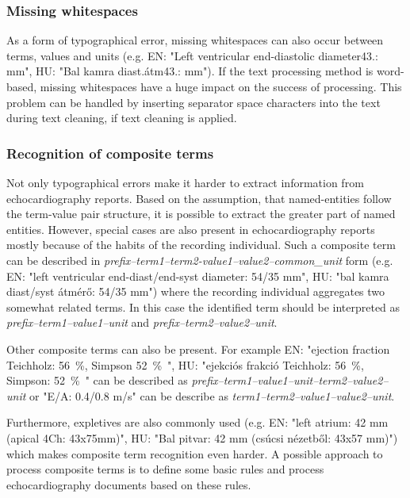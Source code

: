 \subsubsection*{Missing whitespaces}

As a form of typographical error, missing whitespaces can also occur between terms, values and units (e.g. EN: "Left ventricular end-diastolic diameter43.: mm", HU: "Bal kamra diast.átm43.: mm"). If the text processing method is word-based, missing whitespaces have a huge impact on the success of processing. This problem can be handled by inserting separator space characters into the text during text cleaning, if text cleaning is applied.

\subsubsection*{Recognition of composite terms}

Not only typographical errors make it harder to extract information from echocardiography reports. Based on the assumption, that named-entities follow the term-value pair structure, it is possible to extract the greater part of named entities. However, special cases are also present in echocardiography reports mostly because of the habits of the recording individual. Such a composite term can be described in \textit{prefix–term1–term2-value1–value2–common\_unit} form (e.g. EN: "left ventricular end-diast/end-syst diameter: 54/35 mm", HU: "bal kamra diast/syst átmérő: 54/35 mm") where the recording individual aggregates two somewhat related terms. In this case the identified term should be interpreted as \textit{prefix–term1–value1–unit} and \textit{prefix–term2–value2–unit}.

Other composite terms can also be present. For example EN: "ejection fraction Teichholz: \SI{56}{\percent}, Simpson \SI{52}{\percent"}, HU: "ejekciós frakció Teichholz: \SI{56}{\percent}, Simpson: \SI{52}{\percent"} can be described as \textit{prefix–term1–value1–unit–term2–value2–unit} or "E/A: 0.4/0.8 m/s" can be describe as \textit{term1–term2–value1–value2–unit}.

Furthermore, expletives are also commonly used (e.g. EN: "left atrium: 42 mm (apical 4Ch: 43x75mm)", HU: "Bal pitvar: 42 mm (csúcsi nézetből: 43x57 mm)") which makes composite term recognition even harder. A possible approach to process composite terms is to define some basic rules and process echocardiography documents based on these rules.


